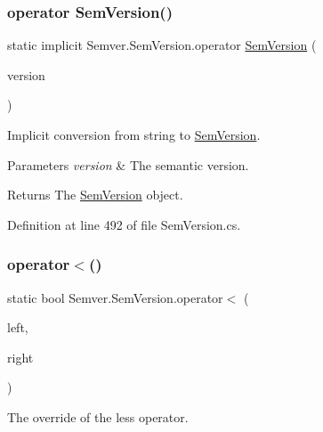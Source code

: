\subsubsection{\texorpdfstring{operator SemVersion()}{operator SemVersion()}}
{\footnotesize\ttfamily static implicit Semver.\+Sem\+Version.\+operator \mbox{\hyperlink{class_semver_1_1_sem_version}{Sem\+Version}} (\begin{DoxyParamCaption}\item[{string}]{version }\end{DoxyParamCaption})\hspace{0.3cm}{\ttfamily [static]}}



Implicit conversion from string to \mbox{\hyperlink{class_semver_1_1_sem_version}{Sem\+Version}}. 


\begin{DoxyParams}{Parameters}
{\em version} & The semantic version.\\
\hline
\end{DoxyParams}
\begin{DoxyReturn}{Returns}
The \mbox{\hyperlink{class_semver_1_1_sem_version}{Sem\+Version}} object.
\end{DoxyReturn}


Definition at line 492 of file Sem\+Version.\+cs.

\mbox{\label{class_semver_1_1_sem_version_a2d6cd9e1f8b7ce8649582170471f4e33}} 
\subsubsection{\texorpdfstring{operator$<$()}{operator<()}}
{\footnotesize\ttfamily static bool Semver.\+Sem\+Version.\+operator$<$ (\begin{DoxyParamCaption}\item[{\mbox{\hyperlink{class_semver_1_1_sem_version}{Sem\+Version}}}]{left,  }\item[{\mbox{\hyperlink{class_semver_1_1_sem_version}{Sem\+Version}}}]{right }\end{DoxyParamCaption})\hspace{0.3cm}{\ttfamily [static]}}



The override of the less operator. 


